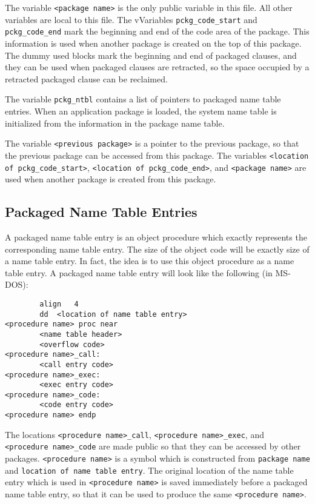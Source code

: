The variable \verb|<package name>| is the only public variable in this file.
All other variables are local to this file. The vVariables \verb|pckg_code_start|
and \verb|pckg_code_end| mark the beginning and end of the code area of the package.
This information is used when another package is created on the top
of this package. The dummy used blocks mark the beginning and end of packaged
clauses, and they can be used when packaged clauses are retracted,
so the space occupied by a retracted packaged clause can be reclaimed.

The variable \verb|pckg_ntbl| contains a list of pointers to packaged name
table entries. When an application package is loaded, the system name 
table is initialized from the information in the package name table.

The variable \verb|<previous package>| is a pointer to the previous package, so that
the previous package can be accessed from this package.
The variables \verb|<location of pckg_code_start>|, \verb|<location of pckg_code_end>|, and
\verb|<package name>| are used when another package is created from this 
package. 

\subsection{Packaged Name Table Entries}

A packaged name table entry is an object procedure which exactly represents 
the corresponding name table entry. 
The size of the object code will be exactly size of a name table entry. 
In fact,
the idea is to use this object procedure as a name table entry.
A packaged name table entry will look like the following (in MS-DOS):

\begin{verbatim}
		align 	4
		dd	<location of name table entry>
<procedure name> proc near
		<name table header>
		<overflow code>
<procedure name>_call:
		<call entry code>
<procedure name>_exec:
		<exec entry code>
<procedure name>_code:
		<code entry code>
<procedure name> endp
\end{verbatim}

The locations \verb|<procedure name>_call|, \verb|<procedure name>_exec|, and
\verb|<procedure name>_code| are made public so that they can be accessed
by other packages. \verb|<procedure name>| is a symbol which is constructed
from \verb|package name| and \verb|location of name table entry|.
The original location of the name table entry which is used in 
\verb|<procedure name>| is saved immediately before a packaged
name table entry, so that it can be used to produce the same \verb|<procedure name>|.



